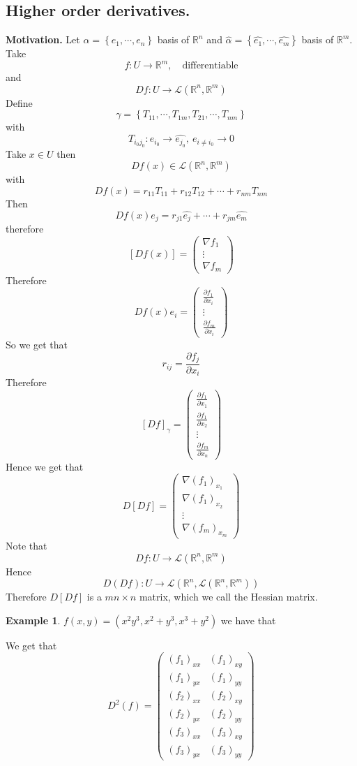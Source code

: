 \documentclass[11pt,a4paper]{article}
\theoremstyle{definition}
\newtheorem{example}[definition]{Example}
\theoremstyle{plain}
\theoremstyle{remark}
\newcommand{\R}{\mathbb{R}}
\renewcommand{\set}[1]{\left\{ #1 \right\}}
\begin{document}
\subsection{Higher order derivatives.} 
\textbf{Motivation.} Let $\alpha = \set{e_1, \cdots, e_n}$ basis of $\R^n$ and 
$\hat{\alpha} = \set{\hat{e_1}, \cdots, \hat{e_m}}$ basis of $\R^m$. Take 
$$f \colon U \to \R^m, \quad \text{differentiable}$$
and 
$$Df \colon U \to \mathcal{L} (\R^n, \R^m)$$
Define 
$$\gamma = \set{T_{11}, \cdots, T_{1m}, T_{21}, \cdots, T_{nm}}$$
with 
$$T_{i_0j_0} \colon e_{i_0} \to \hat{e_{j_0}}, \ e_{i \ne i_0} \to 0$$
Take $x \in U$ then 
$$Df(x) \in \mathcal{L} (\R^n, \R^m)$$
with 
$$Df(x) = r_{11} T_{11} + r_{12} T_{12} + \cdots + r_{nm} T_{nm}$$
Then 
$$Df(x) e_j = r_{j1} \hat{e_j} + \cdots + r_{jm} \hat{e_m}$$
therefore 
$$[Df(x)] = \begin{pmatrix}
    \nabla f_1 \\
    \vdots \\
    \nabla f_m
\end{pmatrix}$$
Therefore 
$$Df(x) e_i = \begin{pmatrix}
    \frac{\partial f_1}{\partial x_i} \\
    \vdots \\
    \frac{\partial f_m}{\partial x_i}
\end{pmatrix}$$
So we get that 
$$r_{ij} = \frac{\partial f_j}{\partial x_i}$$
Therefore 
$$[Df]_\gamma = \begin{pmatrix}
    \frac{\partial f_1}{\partial x_1} \\ \frac{\partial f_1}{\partial x_2} \\ \vdots \\ \frac{\partial f_m}{\partial x_n}
\end{pmatrix}$$
Hence we get that 
$$D[Df] = \begin{pmatrix}
    \nabla (f_1)_{x_1} \\
    \nabla (f_1)_{x_2} \\
    \vdots \\
    \nabla (f_m)_{x_m}
\end{pmatrix}$$
Note that 
$$Df \colon U \to \mathcal{L} (\R^n, \R^m)$$
Hence 
$$D (Df) \colon U \to \mathcal{L} (\R^n,  \mathcal{L} (\R^n, \R^m) )$$
Therefore $D[Df]$ is a $mn \times n$ matrix, which we call the Hessian matrix. 

\begin{example}
    $f(x,y) = (x^2y^3, x^2 + y^3, x^3 + y^2)$ we have that 
    
    We get that 
    $$D^2(f) = \begin{pmatrix}
        (f_1)_{xx} & (f_1)_{xy} \\
        (f_1)_{yx} & (f_1)_{yy} \\
        (f_2)_{xx} & (f_2)_{xy} \\
        (f_2)_{yx} & (f_2)_{yy} \\
        (f_3)_{xx} & (f_3)_{xy} \\
        (f_3)_{yx} & (f_3)_{yy}
    \end{pmatrix}$$
\end{example}
\end{document}
